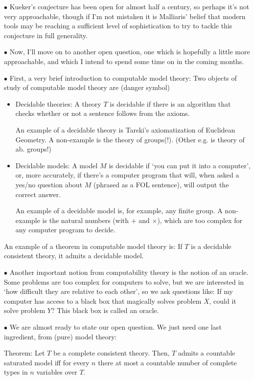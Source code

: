 \documentclass{article}
\newcommand\Point[1]{\noindent \hspace{\labelsep} {\large $\bullet$ #1} \smallskip}
\begin{document}
\Point{Kueker's conjecture has been open for almost half a century, so perhaps it's not very approachable, though if I'm not mistaken it is Malliaris' belief that modern tools may be reaching a sufficient level of sophistication to try to tackle this conjecture in full generality.}

\Point{Now, I'll move on to another open question, one which is hopefully a little more approachable, and which I intend to spend some time on in the coming months.}

\Point{First, a very brief introduction to computable model theory: Two objects of study of computable model theory are (danger symbol)
\begin{itemize}
\item Decidable theories: A theory $T$ is decidable if there is an algorithm that checks whether or not a sentence follows from the axioms.

An example of a decidable theory is Tarski's axiomatization of Euclidean Geometry. A non-example is the theory of groups(!). (Other e.g. is theory of ab. groups!)

\item Decidable models: A model $M$ is decidable if `you can put it into a computer', or, more accurately, if there's a computer program that will, when asked a yes/no question about $M$ (phrased as a FOL sentence), will output the correct answer.

An example of a decidable model is, for example, any finite group. A non-example is the natural numbers (with $+$ and $\times$), which are too complex for any computer program to decide.
\end{itemize}

An example of a theorem in computable model theory is: If $T$ is a decidable consistent theory, it admits a decidable model.}

\Point{Another important notion from computability theory is the notion of an oracle. Some problems are too complex for computers to solve, but we are interested in `how difficult they are relative to each other', so we ask questions like: If my computer has access to a black box that magically solves problem $X$, could it solve problem $Y$? This black box is called an oracle.}

\Point{We are almost ready to state our open question. We just need one last ingredient, from (pure) model theory:

Theorem: Let $T$ be a complete consistent theory. Then, $T$ admits a countable saturated model iff for every $n$ there at most a countable number of complete types in $n$ variables over $T$.}
\end{document}
